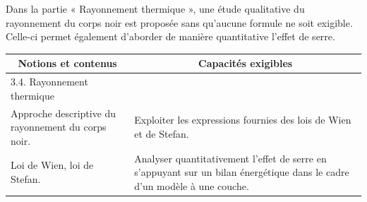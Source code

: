 \vspace{0.25cm}
Dans la partie « Rayonnement thermique », une étude qualitative du rayonnement du corps noir est proposée sans qu'aucune formule ne soit exigible. Celle-ci permet également d'aborder de manière quantitative l'effet de serre.
\begin{tabularx}{\textwidth}{|X|X|}
\hline 
\multicolumn{1}{|c|}{ Notions et contenus } & \multicolumn{1}{c|}{ Capacités exigibles } \\
\hline 
3.4. Rayonnement thermique & \\
\hline 
Approche descriptive du rayonnement du corps noir. & Exploiter les expressions fournies des lois de  Wien et de Stefan. \\
Loi de Wien, loi de Stefan. & Analyser quantitativement l'effet de serre en s'appuyant sur un bilan énergétique dans le cadre d'un modèle à une couche. \\
\hline
\end{tabularx}
